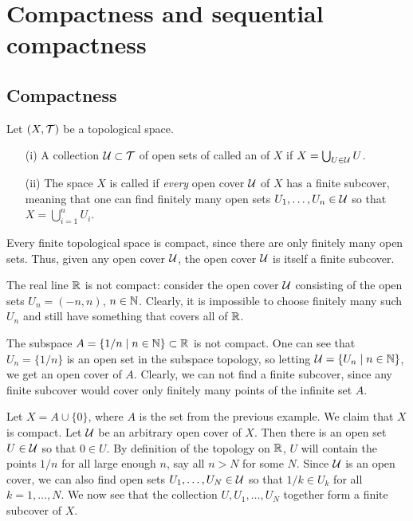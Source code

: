 \section{Compactness and sequential compactness}
\label{compactness}
\subsection{Compactness}
\begin{defn}
  Let $(X,\mathcal{T})$ be a topological space.
  \begin{enumerate}
    \item[(i)] A collection $\mathcal{U} \subset \mathcal{T}$ of open sets of called an  of $X$ if $X = \bigcup_{U \in \mathcal{U}} U$.
    \item[(ii)] The space $X$ is called  if \emph{every} open cover $\mathcal{U}$ of $X$ has a finite subcover, meaning that one can find finitely many open sets $U_1, \dots, U_n \in \mathcal{U}$ so that $X = \bigcup_{i=1}^n U_i$.
  \end{enumerate}
\end{defn}
\begin{example}
  Every finite topological space is compact, since there are only finitely many open sets. Thus, given any open cover $\mathcal{U}$, the open cover $\mathcal{U}$ is itself a finite subcover.
\end{example}
\begin{example}
  \label{reals-not-compact}
  The real line $\mathbb{R}$ is not compact: consider the open cover $\mathcal{U}$ consisting of the open sets $U_n = (-n,n)$, $n \in \mathbb{N}$. Clearly, it is impossible to choose finitely many such $U_n$ and still have something that covers all of $\mathbb{R}$.
\end{example}
\begin{example}
  The subspace $A = \{1/n \mid n \in \mathbb{N}\} \subset \mathbb{R}$ is not compact. One can see that $U_n = \{1/n\}$ is an open set in the subspace topology, so letting $\mathcal{U} = \{U_n \mid n \in \mathbb{N}\}$, we get an open cover of $A$. Clearly, we can not find a finite subcover, since any finite subcover would cover only finitely many points of the infinite set $A$.
\end{example}
\begin{example}
  Let $X = A \cup \{0\}$, where $A$ is the set from the previous example. We claim that $X$ is compact. Let $\mathcal{U}$ be an arbitrary open cover of $X$. Then there is an open set $U \in \mathcal{U}$ so that $0 \in U$. By definition of the topology on $\mathbb{R}$, $U$ will contain the points $1/n$ for all large enough $n$, say all $n > N$ for some $N$. Since $\mathcal{U}$ is an open cover, we can also find open sets $U_1, \dots, U_N \in \mathcal{U}$ so that $1/k \in U_k$ for all $k = 1, \dots, N$. We now see that the collection $U, U_1, \dots, U_N$ together form a finite subcover of $X$.
\end{example}
